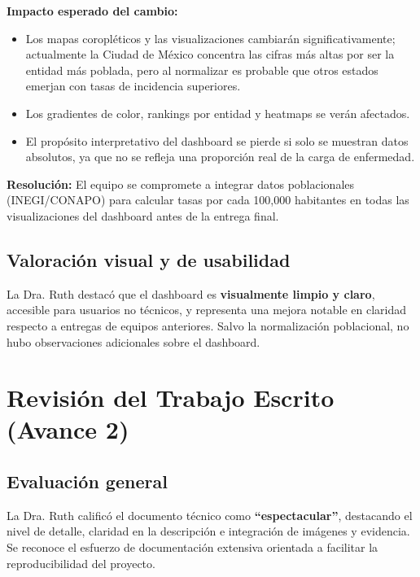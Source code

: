 \documentclass[11pt, a4paper]{article}
\begin{document}
\textbf{Impacto esperado del cambio:}
\begin{itemize}[leftmargin=1.5cm]
    \item Los mapas coropléticos y las visualizaciones cambiarán significativamente; actualmente la Ciudad de México concentra las cifras más altas por ser la entidad más poblada, pero al normalizar es probable que otros estados emerjan con tasas de incidencia superiores.
    \item Los gradientes de color, rankings por entidad y heatmaps se verán afectados.
    \item El propósito interpretativo del dashboard se pierde si solo se muestran datos absolutos, ya que no se refleja una proporción real de la carga de enfermedad.
\end{itemize}

\textbf{Resolución:} El equipo se compromete a integrar datos poblacionales (INEGI/CONAPO) para calcular tasas por cada 100,000 habitantes en todas las visualizaciones del dashboard antes de la entrega final.

\subsection{Valoración visual y de usabilidad}

La Dra. Ruth destacó que el dashboard es \textbf{visualmente limpio y claro}, accesible para usuarios no técnicos, y representa una mejora notable en claridad respecto a entregas de equipos anteriores. Salvo la normalización poblacional, no hubo observaciones adicionales sobre el dashboard.

\vspace{0.5cm}

\section{Revisión del Trabajo Escrito (Avance 2)}

\subsection{Evaluación general}

La Dra. Ruth calificó el documento técnico como \textbf{``espectacular''}, destacando el nivel de detalle, claridad en la descripción e integración de imágenes y evidencia. Se reconoce el esfuerzo de documentación extensiva orientada a facilitar la reproducibilidad del proyecto.
\end{document}

